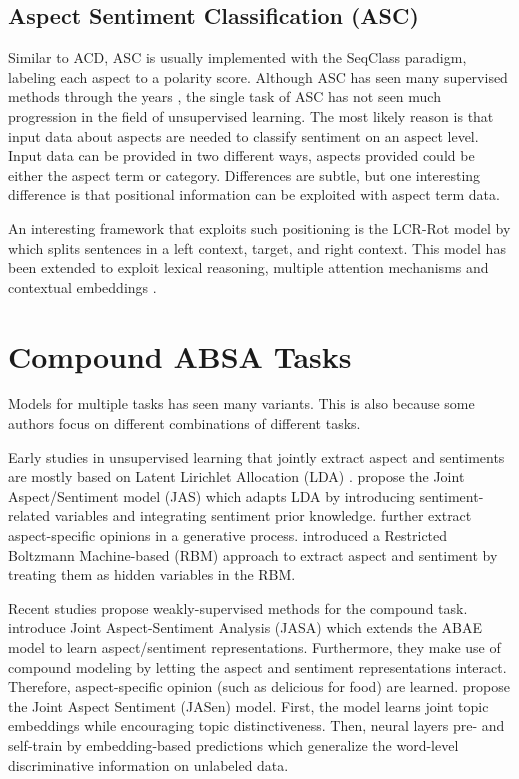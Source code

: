 \documentclass[american, oneside]{ecsgdp}
\begin{document}
\subsection{Aspect Sentiment Classification (ASC)} \label{sec:ASC}
Similar to ACD, ASC is usually implemented with the SeqClass paradigm, labeling each aspect to a polarity score. Although ASC has seen many supervised methods through the years \parencite{Zhang2022Survey}, the single task of ASC has not seen much progression in the field of unsupervised learning. The most likely reason is that input data about aspects are needed to classify sentiment on an aspect level. Input data can be provided in two different ways, aspects provided could be either the aspect term or category. Differences are subtle, but one interesting difference is that positional information can be exploited with aspect term data.

An interesting framework that exploits such positioning is the LCR-Rot model by \textcite{Zheng2018LCR-Rot} which splits sentences in a left context, target, and right context. This model has been extended to exploit lexical reasoning, multiple attention mechanisms and contextual embeddings \parencite{Schouten2017Ontology, Wallaart2019HAABSA, Trusca2020HAABSA++}.

\section{Compound ABSA Tasks} \label{sec:compound}

Models for multiple tasks has seen many variants. This is also because some authors focus on different combinations of different tasks. 

Early studies in unsupervised learning that jointly extract aspect and sentiments are mostly based on Latent Lirichlet Allocation (LDA) \parencite{Blei2003LDA}. \textcite{Xu2012JAS} propose the Joint Aspect/Sentiment model (JAS) which adapts LDA by introducing sentiment-related variables and integrating sentiment prior knowledge. \textcite{Zhao2010MaxEnt-LDA} further extract aspect-specific opinions in a generative process. \textcite{Wang2015Boltzmann} introduced a Restricted Boltzmann Machine-based (RBM) approach to extract aspect and sentiment by treating them as hidden variables in the RBM.

Recent studies propose weakly-supervised methods for the compound task.
\textcite{Zhuang2020JASA} introduce Joint Aspect-Sentiment Analysis (JASA) which extends the ABAE model to learn aspect/sentiment representations. Furthermore, they make use of compound modeling by letting the aspect and sentiment representations interact. Therefore, aspect-specific opinion (such as delicious for food) are learned. \textcite{Huang2020JASen} propose the Joint Aspect Sentiment (JASen) model. First, the model learns joint topic embeddings while encouraging topic distinctiveness. Then, neural layers pre- and self-train by embedding-based predictions which generalize the word-level discriminative information on unlabeled data. 
\end{document}
